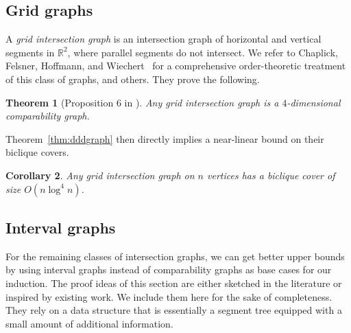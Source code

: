 \documentclass{amsart}
\newtheorem{theorem}{Theorem}%
\newtheorem{corollary}[theorem]{Corollary}
\newcommand{\darkblue}{\color{darkblue}} %
\newcommand{\defn}[1]{\textsl{\darkblue #1}} %
\begin{document}
\subsection{Grid graphs}

A \defn{grid intersection graph} is an intersection graph of horizontal and vertical segments in $\mathbb{R}^2$, where parallel segments do not intersect. We refer to Chaplick, Felsner, Hoffmann, and Wiechert~\cite{chaplick2018grid} for a comprehensive order-theoretic treatment of this class of graphs, and others. They prove the following.

\begin{theorem}[Proposition 6 in \cite{chaplick2018grid}]
    Any grid intersection graph is a $4$-dimensional comparability graph.  
\end{theorem}

Theorem~\ref{thm:dddgraph} then directly implies a near-linear bound on their biclique covers.

\begin{corollary}
    Any grid intersection graph on $n$ vertices has a biclique cover of size $O(n \log^4 n)$.
\end{corollary}

\subsection{Interval graphs}

For the remaining classes of intersection graphs, we can get better upper bounds by using interval graphs instead of comparability graphs as base cases for our induction. The proof ideas of this section are either sketched in the literature or inspired by existing work. We include them here for the sake of completeness. They rely on a data structure that is essentially a segment tree equipped with a small amount of additional information.
\end{document}

